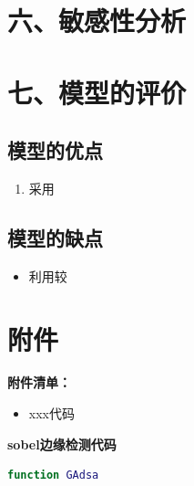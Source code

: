 \documentclass{my_paper}
\begin{document}
\section{六、敏感性分析}
\section{七、模型的评价}

\subsection{模型的优点}
\begin{enumerate}
    \item 采用

\end{enumerate}

\subsection{模型的缺点}
\begin{itemize}
    \item 利用较

\end{itemize}

\newpage
\begin{center}
\end{center}

\newpage
\section{附件}
\textbf{附件清单：}
\renewcommand\theenumi{\roman{enumi}}
\renewcommand\labelenumi{\textbf{附录\theenumi}}
\begin{itemize}
    \item xxx代码
\end{itemize}

\textbf{sobel边缘检测代码}

\begin{lstlisting}[language=matlab]
    function GAdsa 
\end{lstlisting}
\end{document}
